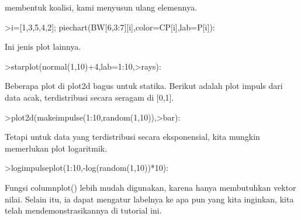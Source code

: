 \documentclass[a4paper,10pt]{article}
\begin{document}
\begin{eulernotebook}
\begin{eulercomment}
\begin{eulercomment}
\begin{eulercomment}
\begin{eulercomment}
\begin{eulercomment}
\begin{eulercomment}
\begin{eulercomment}
\begin{eulercomment}
\begin{eulercomment}
\begin{eulercomment}
\begin{eulercomment}
\begin{eulercomment}
\begin{eulercomment}
\begin{eulercomment}
\begin{eulercomment}
\begin{eulercomment}
\begin{eulercomment}
\begin{eulercomment}
\begin{eulercomment}
membentuk koalisi, kami menyusun ulang elemennya.
\end{eulercomment}
\begin{eulerprompt}
>i=[1,3,5,4,2]; piechart(BW[6,3:7][i],color=CP[i],lab=P[i]):
\end{eulerprompt}
\begin{eulercomment}
Ini jenis plot lainnya.
\end{eulercomment}
\begin{eulerprompt}
>starplot(normal(1,10)+4,lab=1:10,>rays):
\end{eulerprompt}
\begin{eulercomment}
Beberapa plot di plot2d bagus untuk statika. Berikut adalah plot
impuls dari data acak, terdistribusi secara seragam di [0,1].
\end{eulercomment}
\begin{eulerprompt}
>plot2d(makeimpulse(1:10,random(1,10)),>bar):
\end{eulerprompt}
\begin{eulercomment}
Tetapi untuk data yang terdistribusi secara eksponensial, kita mungkin
memerlukan plot logaritmik.
\end{eulercomment}
\begin{eulerprompt}
>logimpulseplot(1:10,-log(random(1,10))*10):
\end{eulerprompt}
\begin{eulercomment}
Fungsi columnplot() lebih mudah digunakan, karena hanya membutuhkan
vektor nilai. Selain itu, ia dapat mengatur labelnya ke apa pun yang
kita inginkan, kita telah mendemonstrasikannya di tutorial ini.


\end{eulercomment}
\end{eulercomment}
\end{eulercomment}
\end{eulercomment}
\end{eulercomment}
\end{eulercomment}
\end{eulercomment}
\end{eulercomment}
\end{eulercomment}
\end{eulercomment}
\end{eulercomment}
\end{eulercomment}
\end{eulercomment}
\end{eulercomment}
\end{eulercomment}
\end{eulercomment}
\end{eulercomment}
\end{eulercomment}
\end{eulercomment}
\end{eulernotebook}
\end{document}
